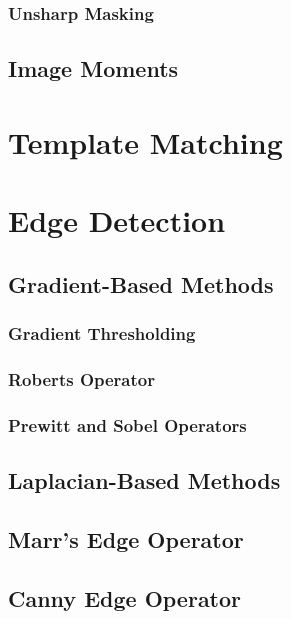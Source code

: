 \documentclass{article}
\begin{document}
\begin{multicols}{2}
\subsubsection{Unsharp Masking}
\subsection{Image Moments}

\section{Template Matching}

\section{Edge Detection}
\subsection{Gradient-Based Methods}
\subsubsection{Gradient Thresholding}
\subsubsection{Roberts Operator}
\subsubsection{Prewitt and Sobel Operators}
\subsection{Laplacian-Based Methods}
\subsection{Marr's Edge Operator}
\subsection{Canny Edge Operator}


\end{multicols}
\end{document}
